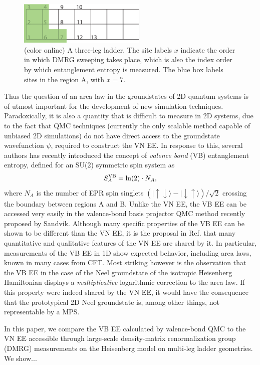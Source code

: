 \documentclass[prl,aps,twocolumn,floatfix,amsmath,amssymb,superscriptaddress,tightenlines]{revtex4}
\begin{document}
\begin{figure}
{
\includegraphics[width=2.4in]{ladder.eps}
\caption{(color online) A three-leg ladder.  The site labels $x$ indicate the order in which DMRG sweeping takes place, which is also the index order by which entanglement entropy is measured.  The blue box labels sites in the region A, with $x=7$.
\label{ladder}}}
\end{figure}

Thus the question of an area law in the groundstates of 2D quantum systems is of utmost important for the development of new simulation techniques.  Paradoxically, it is also a quantity that is difficult to measure in 2D systems, due to the fact that QMC techniques (currently the only scalable method capable of unbiased 2D simulations) do not have direct access to the groundstate wavefunction $\psi$, required to construct the VN EE.  In response to this, several authors \cite{Alet} has recently introduced the concept of {\it valence bond} (VB) entanglement entropy, defined for an SU(2) symmetric spin system as
\begin{equation}
S^{\rm VB}_A = \ln(2) \cdot N_A,
\end{equation}
where $N_A$ is the number of EPR spin singlets ${( |\uparrow \downarrow \rangle - | \downarrow \uparrow \rangle)/\sqrt{2}}$ crossing the boundary between regions A and B.  Unlike the VN EE, the VB EE can be accessed very easily in the valence-bond basis projector QMC method recently proposed by Sandvik.  Although many specific properties of the VB EE can be shown to be different than the VN EE, it is the proposal in Ref. that many quantitative and qualitative features of the VN EE are shared by it.   In particular, measurements of the VB EE in 1D show expected behavior, including area laws,  known in many cases from CFT.  Most striking however is the observation that the VB EE in the case of the Neel groundstate of the isotropic Heisenberg Hamiltonian displays a {\it multiplicative} logarithmic correction to the area law.  If this property were indeed shared by the VN EE, it would have the consequence that the prototypical 2D Neel groundstate is, among other things, not representable by a MPS.

In this paper, we compare the VB EE calculated by valence-bond QMC to the VN EE accessible through large-scale density-matrix renormalization group (DMRG) measurements on the Heisenberg model on multi-leg ladder geometries.    We show...
\end{document}

